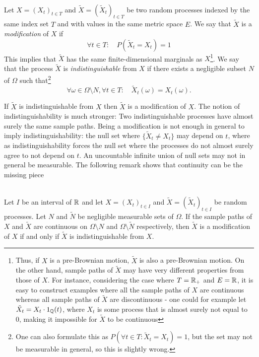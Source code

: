 \begin{definition}\label{chap2.2:definition-modification_and_indistinguishable}
\\
Let $X=(X_t)_{t \in T}$ and $\tilde{X}=(\tilde{X}_t)_{t \in T}$ be two random processes indexed by the same index set $T$ and with values in the same metric space $E$. We say that $\tilde{X}$ is a \textit{modification} of $X$ if
$$\forall t \in T: \quad P(\tilde{X}_t=X_t)=1$$
This implies that $\tilde{X}$ has the same finite-dimensional marginals as $X$\footnote{Thus, if $X$ is a pre-Brownian motion, $\tilde{X}$ is also a pre-Brownian motion. On the other hand, sample paths of $\tilde{X}$ may have very different properties from those of $X$. For instance, considering the case where $T = \mathbb{R}_+$ and $E=\mathbb{R}$, it is easy to construct examples where all the sample paths of $X$ are continuous whereas all sample paths of $\tilde{X}$ are discontinuous - one could for example let $\tilde{X}_t=X_t\cdot 1_{\mathbb{Q}}(t)$, where $X_t$ is some process that is almost surely not equal to 0, making it impossible for $\tilde{X}$ to be continuous}.
We say that the process $\tilde{X}$ is \textit{indistinguishable} from $X$ if there exists a negligible subset $N$ of $\Omega$ such that\footnote{One can also formulate this as $P(\forall t \in T: \tilde{X}_t = X_t)=1$, but the set may not be measurable in general, so this is slightly wrong.}
$$\forall \omega \in \Omega \setminus N, \forall t \in T: \quad \tilde{X}_t(\omega)=X_t(\omega).$$
\end{definition}
If $\tilde{X}$ is indistinguishable from $X$ then $\tilde{X}$ is a modification of $X$. The notion of indistinguishability is much stronger: Two indistinguishable processes have almost surely the same sample paths. Being a modification is not enough in general to imply indistinguishability: the null set where $\{\tilde{X}_t \neq X_t\}$ may depend on $t$, where as indistinguishability forces the null set where the processes do not almost surely agree to not depend on $t$. An uncountable infinite union of null sets may not in general be measurable. The following remark shows that continuity can be the missing piece
\begin{remark}\label{chap2.2:remark-continuity_makes_modifcation_equal_to_indistinguishability}
\\
Let $I$ be an interval of $\mathbb{R}$ and let $X=(X_t)_{t \in I}$ and $\tilde{X}=(\tilde{X}_t)_{t \in I}$ be random processes. Let $N$ and $\tilde{N}$ be negligible measurable sets of $\Omega$. If the sample paths of $X$ and $\tilde{X}$ are continuous on $\Omega \setminus N$ and $\Omega \setminus \tilde{N}$ respectively, then $\tilde{X}$ is a modification of $X$ if and only if $\tilde{X}$ is indistinguishable from $X$.    
\end{remark}
